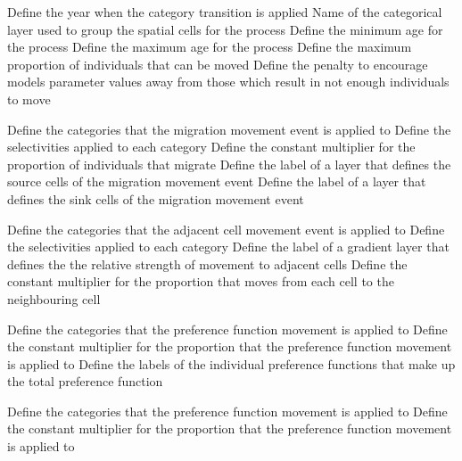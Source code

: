  {Define the year when the category transition is applied}
 {Name of the categorical layer used to group the spatial cells for the process}
 {Define the minimum age for the process }
 {Define the maximum age for the process}
 {Define the maximum proportion of individuals that can be moved}
 {Define the penalty to encourage models parameter values away from those which result in not enough individuals to move}
\par\textbf{}\par
{} {Define the categories that the migration movement event is applied to}
 {Define the selectivities applied to each category}
 {Define the constant multiplier for the proportion of individuals that migrate}
 {Define the label of a layer that defines the source cells of the migration movement event}
 {Define the label of a layer that defines the sink cells of the migration movement event}
\par\textbf{}\par
{} {Define the categories that the adjacent cell movement event is applied to}
 {Define the selectivities applied to each category}
 {Define the label of a gradient layer that defines the the relative strength of movement to adjacent cells}
 {Define the constant multiplier for the proportion that moves from each cell to the neighbouring cell}
\par\textbf{}\par
{} {Define the categories that the preference function movement is applied to}
 {Define the constant multiplier for the proportion that the preference function movement is applied to}
 {Define the labels of the individual  preference functions that make up the total preference function}
\par\textbf{}\par
{} {Define the categories that the preference function movement is applied to}
 {Define the constant multiplier for the proportion that the preference function movement is applied to}
